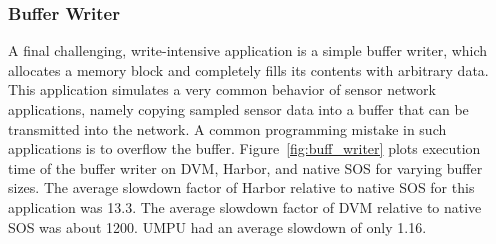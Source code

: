 \subsubsection{Buffer Writer}
%
A final challenging, write-intensive application is a simple buffer writer, which
%
allocates a memory block and completely fills its
contents with arbitrary data.
%
This application simulates a very common behavior of sensor network
applications, namely copying sampled sensor data into a buffer that can be
transmitted into the network.
%
A common programming mistake in such applications is to overflow the
buffer.
%
%
%
%
Figure~\ref{fig:buff_writer} plots execution time of the buffer writer on
DVM, Harbor, and native SOS for varying buffer sizes.
%
The average slowdown factor of Harbor relative to native SOS for this
application was 13.3.
%
%
The average slowdown factor of DVM relative to native SOS was about 1200.
%
%
UMPU had an average slowdown of only 1.16.

%
%
%
%
%
%
%
%
%
%
%

